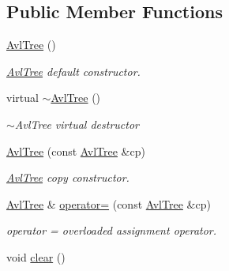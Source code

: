 \subsection*{Public Member Functions}
\begin{DoxyCompactItemize}
\item 
\hypertarget{class_avl_tree_a16ffec16dffe9da5c7b7b0faab5b0620}{\hyperlink{class_avl_tree_a16ffec16dffe9da5c7b7b0faab5b0620}{Avl\-Tree} ()}\label{class_avl_tree_a16ffec16dffe9da5c7b7b0faab5b0620}

\begin{DoxyCompactList}\small\item\em \hyperlink{class_avl_tree}{Avl\-Tree} default constructor. \end{DoxyCompactList}\item 
\hypertarget{class_avl_tree_a3c8a14fc5a22671202082edb7999926d}{virtual \hyperlink{class_avl_tree_a3c8a14fc5a22671202082edb7999926d}{$\sim$\-Avl\-Tree} ()}\label{class_avl_tree_a3c8a14fc5a22671202082edb7999926d}

\begin{DoxyCompactList}\small\item\em $\sim$\-Avl\-Tree virtual destructor \end{DoxyCompactList}\item 
\hyperlink{class_avl_tree_a53dc67ed47b09f8d646cc2693b5c9c04}{Avl\-Tree} (const \hyperlink{class_avl_tree}{Avl\-Tree} \&cp)
\begin{DoxyCompactList}\small\item\em \hyperlink{class_avl_tree}{Avl\-Tree} copy constructor. \end{DoxyCompactList}\item 
\hyperlink{class_avl_tree}{Avl\-Tree} \& \hyperlink{class_avl_tree_a1850c4de3588a85f6dfd887b5286527c}{operator=} (const \hyperlink{class_avl_tree}{Avl\-Tree} \&cp)
\begin{DoxyCompactList}\small\item\em operator = overloaded assignment operator. \end{DoxyCompactList}\item 
\hypertarget{class_avl_tree_a63143b0d8570b80dd7290e8280906233}{void \hyperlink{class_avl_tree_a63143b0d8570b80dd7290e8280906233}{clear} ()}\label{class_avl_tree_a63143b0d8570b80dd7290e8280906233}


\end{DoxyCompactItemize}

